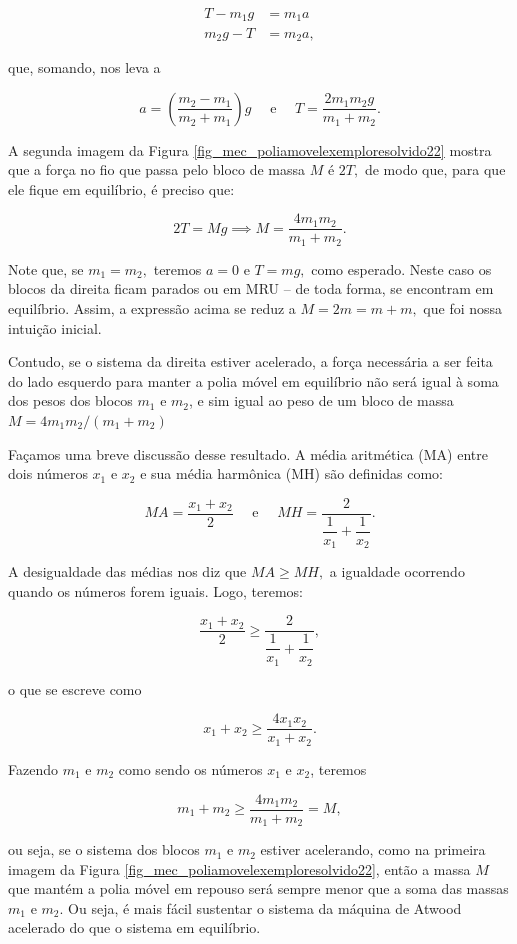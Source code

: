 \begin{exemplo}[Nível II]
\begin{align}
    T - m_1g &= m_1 a \nonumber \\
    m_2g - T &= m_2 a ,\nonumber
\end{align}

\noindent que, somando, nos leva a

$$ a =  \left(\dfrac{m_2 - m_1}{m_2+m_1} \right)g \quad \text{ e } \quad T = \dfrac{2m_1m_2g}{m_1+m_2}.$$

A segunda imagem da Figura \ref{fig_mec_poliamovelexemploresolvido22} mostra que a força no fio que passa pelo bloco de massa $M$ é $2T,$ de modo que, para que ele fique em equilíbrio, é preciso que:

$$ 2T = Mg \implies \boxed{M = \dfrac{4m_1m_2}{m_1+m_2}.}$$

Note que, se $m_1 = m_2,$ teremos $a=0$ e $T = mg, $ como esperado. Neste caso os blocos da direita ficam parados ou em MRU -- de toda forma, se encontram em equilíbrio. Assim, a expressão acima se reduz a $M=2m=m+m,$ que foi nossa intuição inicial.

\medskip

Contudo, se o sistema da direita estiver acelerado, a força necessária a ser feita do lado esquerdo para manter a polia móvel em equilíbrio não será igual à soma dos pesos dos blocos $m_1$ e $m_2$, e sim igual ao peso de um bloco de massa $M=4m_1m_2/(m_1+m_2)$

\medskip 

Façamos uma breve discussão desse resultado. A média aritmética (MA) entre dois números $x_1$ e $x_2$ e sua média harmônica (MH) são definidas como:

$$ MA = \dfrac{x_1+x_2}{2} \quad \text{ e } \quad MH = \dfrac{2}{\dfrac{1}{x_1} + \dfrac{1}{x_2}}.$$

A desigualdade das médias nos diz que $MA \geq MH,$ a igualdade ocorrendo quando os números forem iguais. Logo, teremos:

$$ \dfrac{x_1+x_2}{2} \geq  \dfrac{2}{\dfrac{1}{x_1} + \dfrac{1}{x_2}},$$

\noindent o que se escreve como

$$ x_1+x_2 \geq \dfrac{4x_1x_2}{x_1+x_2}.$$

Fazendo $m_1$ e $m_2$ como sendo os números $x_1$ e $x_2$, teremos

$$ m_1+m_2 \geq \dfrac{4m_1m_2}{m_1+m_2} = M,$$

\noindent ou seja, se o sistema dos blocos $m_1$ e $m_2$ estiver acelerando, como na primeira imagem da Figura \ref{fig_mec_poliamovelexemploresolvido22}, então a massa $M$ que mantém a polia móvel em repouso será sempre menor que a soma das massas $m_1$ e $m_2.$ Ou seja, é mais fácil sustentar o sistema da máquina de Atwood acelerado do que o sistema em equilíbrio.


\end{exemplo}
\vspace{0.3cm}








